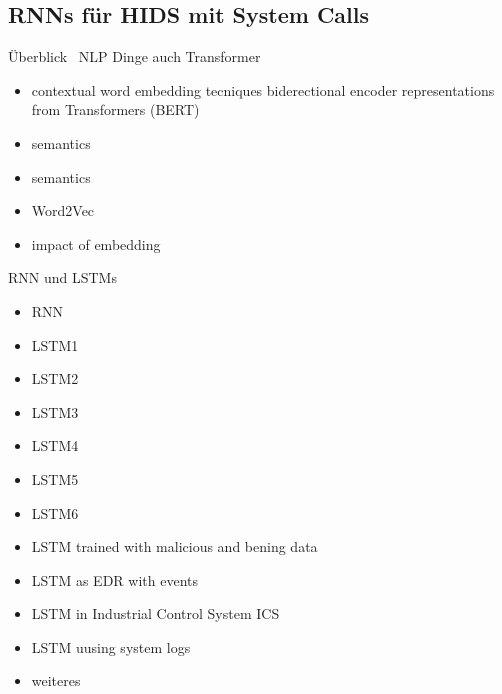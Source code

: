     \subsection{RNNs für HIDS mit System Calls}
        Überblick~\cite{NLPHIDSSWORNA2022}
        NLP Dinge auch Transformer
        \begin{itemize}
            \item contextual word embedding tecniques biderectional encoder representations from Transformers (BERT)~\cite{NLPBERT2018}
            \item semantics~\cite{SEMANTICSLAKSHMANAN2015}
            \item semantics~\cite{SEMANTICSCREECH2014}
            \item Word2Vec~\cite{W2VWUNDERLICH2019}
            \item impact of embedding~\cite{IMPACTOFEMBEDDINGWUNDERLICH2020}
        \end{itemize}
        RNN und LSTMs
        \begin{itemize}
            \item RNN~\cite{RNN/CNN}
            \item LSTM1~\cite{LSTMsys}
            \item LSTM2~\cite{LSTMSURATKAR2019} 
            \item LSTM3~\cite{NIU2020} 
            \item LSTM4~\cite{BIDIRECTIONALLSTMCHAWLA2019} 
            \item LSTM5~\cite{VARIATIONALLSTMBOUZAR2019} 
            \item LSTM6~\cite{RNNVEDBOUZAR2020} 
            \item LSTM trained with malicious and bening data~\cite{LSTMKIM2016} %
            \item LSTM as EDR with events~\cite{EVENTLSTMVASQUEZ2020}
            \item LSTM in Industrial Control System ICS~\cite{ICSLSTMFENG2017} %
            \item LSTM uusing system logs~\cite{LOGLSTMMIN2017} %
            
            \item weiteres
        \end{itemize}
